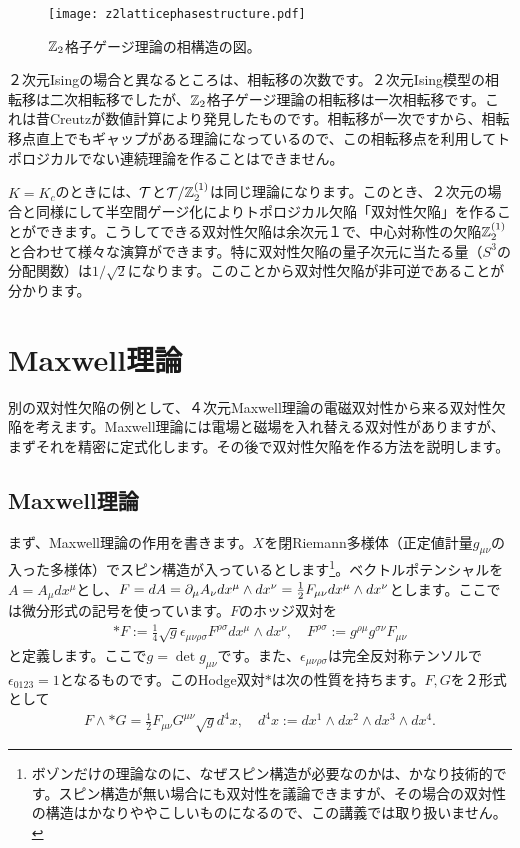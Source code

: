 \documentclass[generalized_symmetry.tex]{subfiles}
\begin{document}
\begin{figure}[htbp]
  \centering
  \texttt{[image: z2latticephasestructure.pdf]}
  \caption{$\mbox{$\mathbb{Z}_{2}$}$格子ゲージ理論の相構造の図。}
  \label{fig:z2latticephasestructure}
\end{figure}

２次元Isingの場合と異なるところは、相転移の次数です。２次元Ising模型の相転移は二次相転移でしたが、$\mbox{$\mathbb{Z}_{2}$}$格子ゲージ理論の相転移は一次相転移です。これは昔Creutzが数値計算により発見したものです。相転移が一次ですから、相転移点直上でもギャップがある理論になっているので、この相転移点を利用してトポロジカルでない連続理論を作ることはできません。

$K=K_c$のときには、$\mathcal{T}$と$\mathcal{T}/\mathbb{Z}_{2}^{(1)}$は同じ理論になります。このとき、２次元の場合と同様にして半空間ゲージ化によりトポロジカル欠陥「双対性欠陥」を作ることができます。こうしてできる双対性欠陥は余次元１で、中心対称性の欠陥$\mathbb{Z}_{2}^{(1)}$と合わせて様々な演算ができます。特に双対性欠陥の量子次元に当たる量（$S^3$の分配関数）は$1/\sqrt{2}$になります。このことから双対性欠陥が非可逆であることが分かります。

\section{Maxwell理論}

別の双対性欠陥の例として、４次元Maxwell理論の電磁双対性から来る双対性欠陥を考えます。Maxwell理論には電場と磁場を入れ替える双対性がありますが、まずそれを精密に定式化します。その後で双対性欠陥を作る方法を説明します。

\subsection{Maxwell理論}
まず、Maxwell理論の作用を書きます。$X$を閉Riemann多様体（正定値計量$g_{\mu\nu}$の入った多様体）でスピン構造が入っているとします\footnote{ボゾンだけの理論なのに、なぜスピン構造が必要なのかは、かなり技術的です。スピン構造が無い場合にも双対性を議論できますが、その場合の双対性の構造はかなりややこしいものになるので、この講義では取り扱いません。}。ベクトルポテンシャルを$A=A_{\mu}dx^{\mu}$とし、$F=dA=\partial_{\mu}A_{\nu}dx^{\mu}\wedge dx^{\nu}=\frac{1}{2}F_{\mu\nu}dx^{\mu}\wedge dx^{\nu}$とします。ここでは微分形式の記号を使っています。$F$のホッジ双対を
\begin{align}
  *F:=\frac{1}{4}\sqrt{g}\epsilon_{\mu\nu\rho\sigma}F^{\rho\sigma}dx^{\mu}\wedge dx^{\nu},\quad
  F^{\rho\sigma}:=g^{\rho\mu}g^{\sigma\nu}F_{\mu\nu}
\end{align}
と定義します。ここで$g=\det g_{\mu\nu}$です。また、$\epsilon_{\mu\nu\rho\sigma}$は完全反対称テンソルで$\epsilon_{0123}=1$となるものです。このHodge双対$*$は次の性質を持ちます。$F,G$を２形式として
\begin{align}
  F\wedge *G = \frac{1}{2}F_{\mu\nu}G^{\mu\nu} \sqrt{g}d^4x,\quad d^4x :=dx^{1}\wedge dx^{2}\wedge dx^{3}\wedge dx^{4}.
\end{align}
\end{document}
